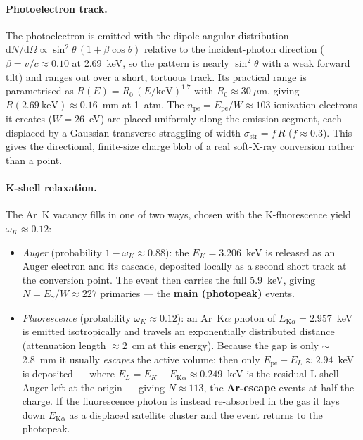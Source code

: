 \documentclass[11pt,a4paper]{article}
\begin{document}
\paragraph{Photoelectron track.} The photoelectron is emitted with the dipole angular distribution
$\mathrm{d}N/\mathrm{d}\Omega \propto \sin^2\theta\,(1+\beta\cos\theta)$ relative to the incident-photon
direction ($\beta=v/c\approx0.10$ at 2.69~keV, so the pattern is nearly $\sin^2\theta$ with a weak
forward tilt) and ranges out over a short, tortuous track. Its practical range is parametrised as
$R(E)=R_0\,(E/\text{keV})^{1.7}$ with $R_0\approx30~\mu$m, giving $R(2.69~\text{keV})\approx0.16$~mm at
1~atm. The $n_\mathrm{pe}=E_\mathrm{pe}/W\approx103$ ionization electrons it creates ($W=26$~eV) are
placed uniformly along the emission segment, each displaced by a Gaussian transverse straggling of width
$\sigma_\mathrm{str}=f\,R$ ($f\approx0.3$). This gives the directional, finite-size charge blob of a real
soft-X-ray conversion rather than a point.

\paragraph{K-shell relaxation.} The Ar~K vacancy fills in one of two ways, chosen with the
K-fluorescence yield $\omega_K\approx0.12$:
\begin{itemize}
  \item \emph{Auger} (probability $1-\omega_K\approx0.88$): the $E_K=3.206$~keV is released as an Auger
        electron and its cascade, deposited locally as a second short track at the conversion point. The
        event then carries the full 5.9~keV, giving $N=E_\gamma/W\approx227$ primaries --- the
        \textbf{main (photopeak)} events.
  \item \emph{Fluorescence} (probability $\omega_K\approx0.12$): an Ar~K$\alpha$ photon of
        $E_{\mathrm{K}\alpha}=2.957$~keV is emitted isotropically and travels an exponentially
        distributed distance (attenuation length $\approx2$~cm at this energy). Because the gap is only
        $\sim$2.8~mm it usually \emph{escapes} the active volume: then only
        $E_\mathrm{pe}+E_L\approx2.94$~keV is deposited --- where $E_L=E_K-E_{\mathrm{K}\alpha}\approx
        0.249$~keV is the residual L-shell Auger left at the origin --- giving $N\approx113$, the
        \textbf{Ar-escape} events at half the charge. If the fluorescence photon is instead re-absorbed
        in the gas it lays down $E_{\mathrm{K}\alpha}$ as a displaced satellite cluster and the event
        returns to the photopeak.
\end{itemize}
\end{document}
